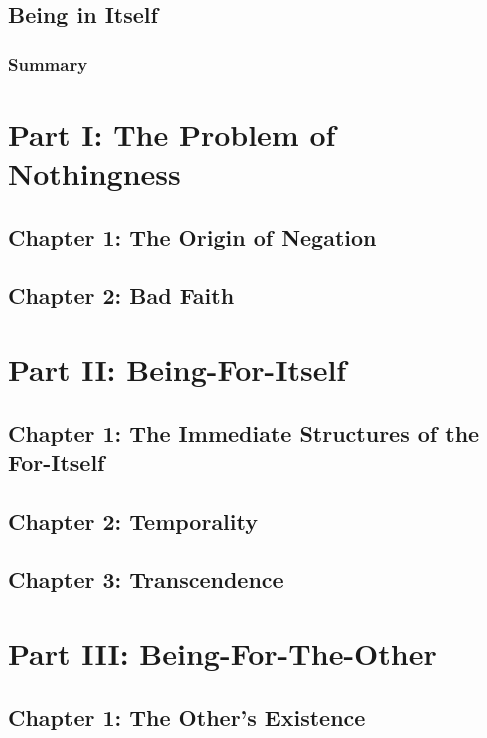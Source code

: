 \begin{enumerate}
\end{enumerate}
\subsection{Being in Itself}
\subsubsection*{Summary}

\section{Part I: The Problem of Nothingness}

\subsection{Chapter 1: The Origin of Negation}

\subsection{Chapter 2: Bad Faith}

\section{Part II: Being-For-Itself}

\subsection{Chapter 1: The Immediate Structures of the For-Itself}

\subsection{Chapter 2: Temporality}

\subsection{Chapter 3: Transcendence}

\section{Part III: Being-For-The-Other}

\subsection{Chapter 1: The Other's Existence}

